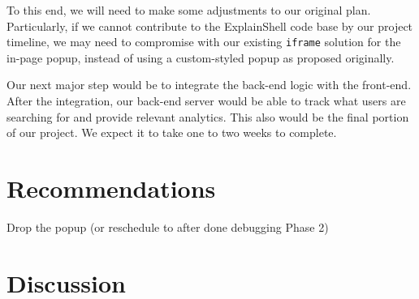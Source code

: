 \documentclass[11pt]{article}
\begin{document}
To this end, we will need to make some adjustments to our original plan.
Particularly, if we cannot contribute to the ExplainShell code base by our
project timeline, we may need to compromise with our existing \texttt{iframe}
solution for the in-page popup, instead of using a custom-styled popup as
proposed originally.

Our next major step would be to integrate the back-end logic with the
front-end. After the integration, our back-end server would be able to
track what users are searching for and provide relevant analytics. This also
would be the final portion of our project. We expect it to take one to two
weeks to complete.

\section{Recommendations}

Drop the popup (or reschedule to after done debugging Phase 2)

\section{Discussion}
\end{document}
